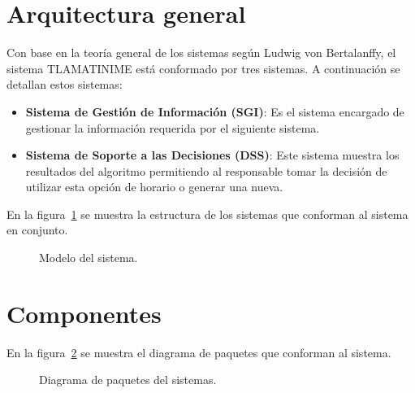 \label{sec:bosquejoGeneral}

\section{Arquitectura general}

	Con base en la teoría general de los sistemas según Ludwig von Bertalanffy, el sistema TLAMATINIME está conformado por tres sistemas. A continuación se detallan estos sistemas:
	
	\begin{itemize}
		\item \textbf{Sistema de Gestión de Información (SGI)}: Es el sistema encargado de gestionar la información requerida por el siguiente sistema.
				
		\item \textbf{Sistema de Soporte a las Decisiones (DSS)}: Este sistema muestra los resultados del algoritmo permitiendo al responsable tomar la decisión de utilizar esta opción de horario o generar una nueva.
	\end{itemize}
	
	En la figura~\ref{fig:sistemaT} se muestra la estructura de los sistemas que conforman al sistema en conjunto.

	\begin{figure}[htbp!]
		\begin{center}
			\caption{Modelo del sistema.}
			\label{fig:sistemaT}
		\end{center}
	\end{figure}

	

\section{Componentes}

	En la figura~\ref{fig:paquetes} se muestra el diagrama de paquetes que conforman al sistema.
	
	\begin{figure}[htbp!]
		\begin{center}
			\caption{Diagrama de paquetes del sistemas.}
			\label{fig:paquetes}
		\end{center}
	\end{figure}
	

